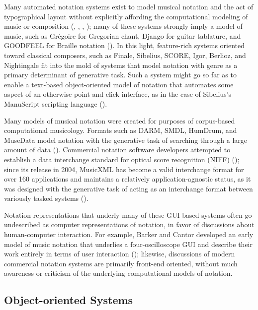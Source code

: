Many automated notation systems exist to model musical notation and the act of typographical layout without explicitly affording the computational modeling of music or composition (\cite{Smith:1972mw}, \cite{Nienhuys:2003ve}, \cite{Hoos:1998bd}, \cite{hamel1noteability}); many of these systems strongly imply a model of music, such as Gr\'{e}goire for Gregorian chant, Django for guitar tablature, and GOODFEEL for Braille notation (\cite{2006}). In this light, feature-rich systems oriented toward classical composers, such as Finale, Sibelius, SCORE, Igor, Berlioz, and Nightingale fit into the mold of systems that model notation with genre as a primary determinant of generative task. Such a system might go so far as to enable a text-based object-oriented model of notation that automates some aspect of an otherwise point-and-click interface, as in the case of Sibelius's ManuScript scripting language (\cite{Technology:qc}). 

Many models of musical notation were created for purposes of corpus-based computational musicology. Formats such as DARM, SMDL, HumDrum, and MuseData model notation with the generative task of searching through a large amount of data (\cite{Selfridge-Field:1997ud}). Commercial notation software developers attempted to establish a data interchange standard for optical score recognition (NIFF) (\cite{niff1995niff}); since its release in 2004, MusicXML has become a valid interchange format for over 160 applications and maintains a relatively application-agnostic status, as it was designed with the generative task of acting as an interchange format between variously tasked systems (\cite{Good:2001if}).

Notation representations that underly many of these GUI-based systems often go undescribed as computer representations of notation, in favor of discussions about human-computer interaction. For example, Barker and Cantor developed an early model of music notation that underlies a four-oscilloscope GUI and describe their work entirely in terms of user interaction (\cite{cantor1971computer}); likewise, discussions of modern commercial notation systems are primarily front-end oriented, without much awareness or criticism of the underlying computational models of notation.

\subsection{Object-oriented Systems}
